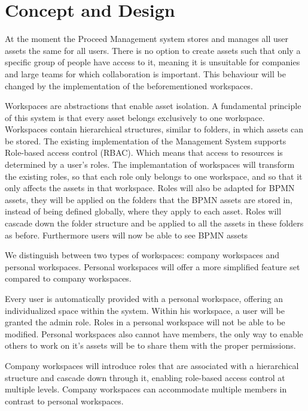 \chapter{Concept and Design}
\label{cha:conceptanddesign}

At the moment the Proceed Management system stores and manages all user assets the same for all users.
There is no option to create assets such that only a specific group of people have access to it, meaning it is unsuitable for companies and large teams for which collaboration is important.
This behaviour will be changed by the implementation of the beforementioned workspaces.

Workspaces are abstractions that enable asset isolation.
A fundamental principle of this system is that every asset belongs exclusively to one workspace.
Workspaces contain hierarchical structures, similar to folders, in which assets can be stored.
The existing implementation of the Management System supports Role-based access control (RBAC).
Which means that access to resources is determined by a user's roles.
The implemantation of workspaces will transform the existing roles, so that each role only belongs to one workspace, and so that it only affects the assets in that workspace.
Roles will also be adapted for BPMN assets, they will be applied on the folders that the BPMN assets are stored in, instead of being defined globally, where they apply to each asset.
Roles will cascade down the folder structure and be applied to all the assets in these folders as before.
Furthermore users will now be able to see BPMN assets 

We distinguish between two types of workspaces: company workspaces and personal workspaces.
Personal workspaces will offer a more simplified feature set compared to company workspaces.

Every user is automatically provided with a personal workspace, offering an individualized space within the system.
Within his workspace, a user will be granted the admin role.
Roles in a personal workspace will not be able to be modified.
Personal workspaces also cannot have members, the only way to enable others to work on it's assets will be to share them with the proper permissions.

Company workspaces will introduce roles that are associated with a hierarchical structure and cascade down through it, enabling role-based access control at multiple levels.
Company workspaces can accommodate multiple members in contrast to personal workspaces.

